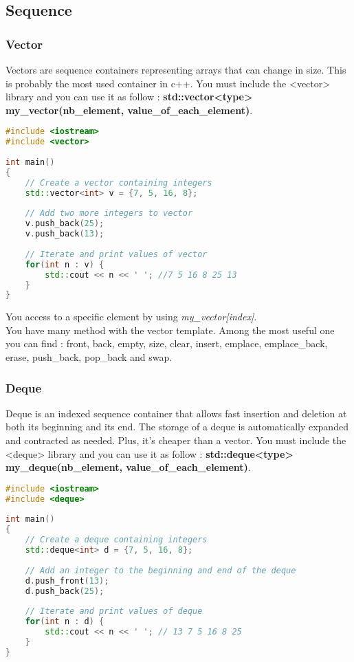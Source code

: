 \documentclass[a4paper, 12pt, titlepage]{scrartcl} %
\begin{document}
\subsection{Sequence}
\subsubsection{Vector}
Vectors are sequence containers representing arrays that can change in size. This is probably the most used container in c++. You must include the <vector> library and you can use it as follow : \textbf{std::vector<type> my\_vector(nb\_element, value\_of\_each\_element)}.

\begin{lstlisting}[language=C++]
#include <iostream>
#include <vector>
 
int main()
{
    // Create a vector containing integers
    std::vector<int> v = {7, 5, 16, 8};
 
    // Add two more integers to vector
    v.push_back(25);
    v.push_back(13);
 
    // Iterate and print values of vector
    for(int n : v) {
        std::cout << n << ' '; //7 5 16 8 25 13
    }
}
\end{lstlisting} \vspace{5mm}

You access to a specific element by using \textit{my\_vector[index]}. \\
You have many method with the vector template. Among the most useful one you can find : front, back, empty, size, clear, insert, emplace, emplace\_back, erase, push\_back, pop\_back  and swap.

\subsubsection{Deque}
Deque is an indexed sequence container that allows fast insertion and deletion at both its beginning and its end. The storage of a deque is automatically expanded and contracted as needed. Plus, it's cheaper than a vector. You must include the <deque> library and you can use it as follow : \textbf{std::deque<type> my\_deque(nb\_element, value\_of\_each\_element)}.

\begin{lstlisting}[language=C++]
#include <iostream>
#include <deque>
 
int main()
{
    // Create a deque containing integers
    std::deque<int> d = {7, 5, 16, 8};
 
    // Add an integer to the beginning and end of the deque
    d.push_front(13);
    d.push_back(25);
 
    // Iterate and print values of deque
    for(int n : d) {
        std::cout << n << ' '; // 13 7 5 16 8 25
    }
}
\end{lstlisting} \vspace{5mm}
\end{document}
